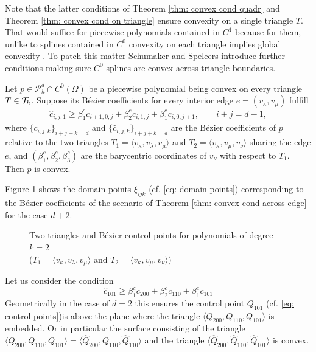 Note that the latter conditions of Theorem \ref{thm: convex cond quadr} and Theorem \ref{thm: convex cond on triangle} ensure convexity on a single triangle $T$. That would suffice for piecewise polynomials contained in $C^1$ because for them, unlike to splines contained in $C^0$ convexity on each triangle implies global convexity \cite[Theorem 3.1.]{SS2010}. To patch this matter Schumaker and Speleers introduce further conditions making sure $C^0$ splines are convex across triangle boundaries.
\begin{theorem}\label{thm: convex cond across edge}
	Let $p \in \mathcal P^d_h \cap C^0(\Omega)$ be a piecewise polynomial being convex on every triangle $T \in \mathcal{T}_h$. Suppose its B\'ezier coefficients for every interior edge $e =(v_\kappa, v_\mu)$ fulfill 
	\begin{align}
		{\hat c_{i,j,1}}  \geq  \beta_1^c c_{i+1, 0,j} +\beta_2^c c_{i,1,j} + \beta_1^c c_{i, 0,j+1}, \qquad i+j=d-1, \label{eq: convexity across edge}
	\end{align}
where  $\{c_{i,j,k}\}_{i+j+k=d}$ and $\{ {\hat c_{i,j,k}}\}_{i+j+k=d}$ are the B\'ezier coefficients of $p$ relative to the two triangles $T_1 = \langle v_\kappa, v_\lambda, v_\mu \rangle$ and $T_2 = \langle v_\kappa, v_\mu, v_\nu \rangle$ sharing the edge $e$, and $(\beta_1^c,\beta_2^c,\beta_3^c)$ are the barycentric coordinates of $v_\nu$ with respect to $T_1$. Then $p$ is convex.
\end{theorem}

Figure \ref{fig: convexity condition} shows the domain points $\xi_{ijk}$ (cf. \eqref{eq: domain points}) corresponding to the B\'ezier coefficients of the scenario of Theorem \ref{thm: convex cond across edge} for the case $d+2$.
\begin{figure}[H]
	
	\caption{Two triangles and B\'ezier control points for polynomials of degree $k=2$ \\($T_1 = \langle v_\kappa, v_\lambda, v_\mu \rangle$ and $T_2 = \langle v_\kappa, v_\mu, v_\nu \rangle$)}
	\label{fig: convexity condition}
\end{figure}
 Let us consider the condition
\[
		{\hat c_{101}} \geq \beta_1^c c_{200} +\beta_2^c c_{110} + \beta_1^c c_{101}	
\]
Geometrically in the case of $d=2$ this ensures the control point $Q_{101}$ (cf. \eqref{eq: control points})is above the plane where the triangle $\langle Q_{200}, Q_{110}, Q_{101} \rangle$ is embedded. %
Or in particular the surface consisting of the triangle $\langle Q_{200}, Q_{110}, Q_{101} \rangle= \langle \hat Q_{200}, Q_{110}, \hat Q_{110} \rangle$  and the triangle $\langle \hat Q_{200}, \hat Q_{110}, \hat Q_{101} \rangle$ is convex.

